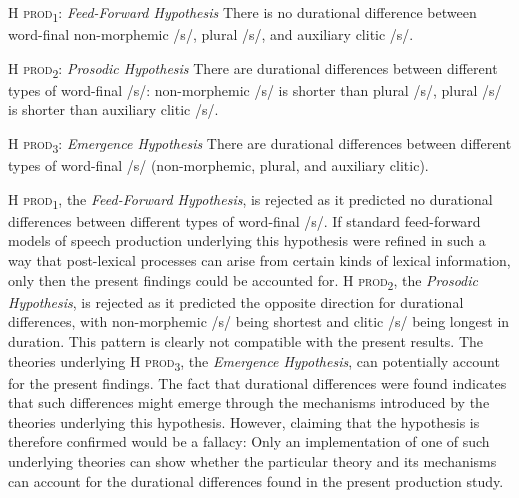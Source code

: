 \begin{description}
\item\textsc{H prod\textsubscript{1}}: \textit{Feed-Forward Hypothesis} \newline
There is no durational difference between word-final non-morphemic /s/, plural /s/, and auxiliary clitic /s/.

\item\textsc{H prod\textsubscript{2}}: \textit{Prosodic Hypothesis} \newline
There are durational differences between different types of word-final /s/: 
non-morphemic /s/ is shorter than plural /s/, plural /s/ is shorter than auxiliary clitic /s/.

\item\textsc{H prod\textsubscript{3}}: \textit{Emergence Hypothesis} \newline
There are durational differences between different types of word-final /s/ (non-morphemic, plural, and auxiliary clitic).
\end{description}

\textsc{H prod\textsubscript{1}}, the \textit{Feed-Forward Hypothesis}, is rejected as it predicted no durational differences between different types of word-final /s/. If standard feed-forward models of speech production underlying this hypothesis were refined in such a way that post-lexical processes can arise from certain kinds of lexical information, only then the present findings could be accounted for. \textsc{H prod\textsubscript{2}}, the \textit{Prosodic Hypothesis}, is rejected as it predicted the opposite direction for durational differences, with non-morphemic /s/ being shortest and clitic /s/ being longest in duration. This pattern is clearly not compatible with the present results. The theories underlying \textsc{H prod\textsubscript{3}}, the \textit{Emergence Hypothesis}, can potentially account for the present findings. The fact that durational differences were found indicates that such differences might emerge through the mechanisms introduced by the theories underlying this hypothesis. However, claiming that the hypothesis is therefore confirmed would be a fallacy: Only an implementation of one of such underlying theories can show whether the particular theory and its mechanisms can account for the durational differences found in the present production study.


